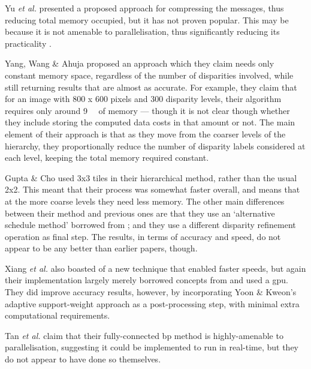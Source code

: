 Yu \textit{et al.} \cite{Yu2007} presented a proposed approach for compressing the messages, thus reducing total memory occupied, but it has not proven popular.  This may be because it is not amenable to parallelisation, thus significantly reducing its practicality \cite{Yang2010}.

Yang, Wang \& Ahuja \cite{Yang2010} proposed an approach which they claim needs only constant memory space, regardless of the number of disparities involved, while still returning results that are almost as accurate.  For example, they claim that for an image with 800 x 600 pixels and 300 disparity levels, their algorithm requires only around \SI{9}{\mebi\byte} of memory --- though it is not clear though whether they include storing the computed data costs in that amount or not.  The main element of their approach is that as they move from the coarser levels of the hierarchy, they proportionally reduce the number of disparity labels considered at each level, keeping the total memory required constant.  %

Gupta \& Cho \cite{Gupta2012} used 3x3 tiles in their hierarchical method, rather than the usual 2x2.  This meant that their process was somewhat faster overall, and means that at the more coarse levels they need less memory.  The other main differences between their method and previous ones are that they use an `alternative schedule method' borrowed from \cite{Tappen2003}; and they use a different disparity refinement operation as final step.  The results, in terms of accuracy and speed, do not appear to be any better than earlier papers, though.

Xiang \textit{et al.} \cite{Xiang2012} also boasted of a new technique that enabled faster speeds, but again their implementation largely merely borrowed concepts from \cite{Felzenszwalb2006} and used a \gls{gpu}.  They did improve accuracy results, however, by incorporating Yoon \& Kweon's \cite{Yoon2005} adaptive support-weight approach as a post-processing step, with minimal extra computational requirements.

Tan \textit{et al.} \cite{Tan2017} claim that their fully-connected \gls{bp} method is highly-amenable to parallelisation, suggesting it could be implemented to run in real-time, but they do not appear to have done so themselves.

